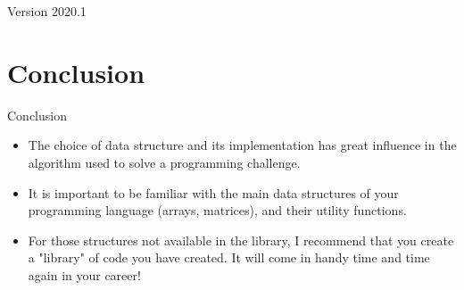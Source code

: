 \documentclass{beamer}
\subtitle[Week 2]{Week 2 - Data Structures}
\date[2020/5/12]{2020/5/12\\{\smaller(last updated: \today)}}
\begin{document}
\begin{CJK}{UTF8}{ipxm}

\begin{frame}
\maketitle
\vfill

\hfill Version 2020.1
\end{frame}



% 



\section{Conclusion}
\begin{frame}{Conclusion}
  \begin{itemize}
    \item The choice of data structure and its implementation has great influence in the algorithm used to solve a programming challenge.
    \bigskip

    \item It is important to be familiar with the main data structures of your programming language (arrays, matrices), and their utility functions.\bigskip

    \item For those structures not available in the library, I recommend that you create a "library" of code you have created. It will come in handy time and time again in your career!
  \end{itemize}

\end{frame}


\end{CJK}
\end{document}
